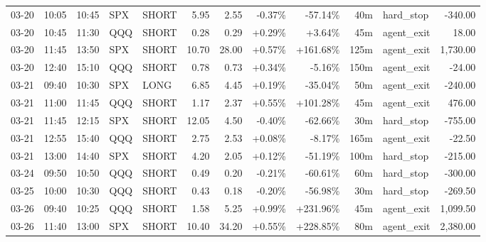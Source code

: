 \documentclass[11pt,a4paper,twoside]{article}
\begin{document}
\begin{center}
\begin{longtable}{>{\color{txtmain}}l l l l l r r r r r >{\color{txtmain}}l r}
03-20 & 10:05 & 10:45 & SPX & SHORT & 5.95 & 2.55 & \textcolor{lossred}{-0.37\%} & \textcolor{lossred}{-57.14\%} & 40m & hard\_stop & \textcolor{lossred}{-340.00} \\
03-20 & 10:45 & 11:30 & QQQ & SHORT & 0.28 & 0.29 & \textcolor{wingreen}{+0.29\%} & \textcolor{wingreen}{+3.64\%} & 45m & agent\_exit & \textcolor{wingreen}{18.00} \\
03-20 & 11:45 & 13:50 & SPX & SHORT & 10.70 & 28.00 & \textcolor{wingreen}{+0.57\%} & \textcolor{wingreen}{+161.68\%} & 125m & agent\_exit & \textcolor{wingreen}{1,730.00} \\
03-20 & 12:40 & 15:10 & QQQ & SHORT & 0.78 & 0.73 & \textcolor{wingreen}{+0.34\%} & \textcolor{lossred}{-5.16\%} & 150m & agent\_exit & \textcolor{lossred}{-24.00} \\
03-21 & 09:40 & 10:30 & SPX & LONG & 6.85 & 4.45 & \textcolor{wingreen}{+0.19\%} & \textcolor{lossred}{-35.04\%} & 50m & agent\_exit & \textcolor{lossred}{-240.00} \\
03-21 & 11:00 & 11:45 & QQQ & SHORT & 1.17 & 2.37 & \textcolor{wingreen}{+0.55\%} & \textcolor{wingreen}{+101.28\%} & 45m & agent\_exit & \textcolor{wingreen}{476.00} \\
03-21 & 11:45 & 12:15 & SPX & SHORT & 12.05 & 4.50 & \textcolor{lossred}{-0.40\%} & \textcolor{lossred}{-62.66\%} & 30m & hard\_stop & \textcolor{lossred}{-755.00} \\
03-21 & 12:55 & 15:40 & QQQ & SHORT & 2.75 & 2.53 & \textcolor{wingreen}{+0.08\%} & \textcolor{lossred}{-8.17\%} & 165m & agent\_exit & \textcolor{lossred}{-22.50} \\
03-21 & 13:00 & 14:40 & SPX & SHORT & 4.20 & 2.05 & \textcolor{wingreen}{+0.12\%} & \textcolor{lossred}{-51.19\%} & 100m & hard\_stop & \textcolor{lossred}{-215.00} \\
03-24 & 09:50 & 10:50 & QQQ & SHORT & 0.49 & 0.20 & \textcolor{lossred}{-0.21\%} & \textcolor{lossred}{-60.61\%} & 60m & hard\_stop & \textcolor{lossred}{-300.00} \\
03-25 & 10:00 & 10:30 & QQQ & SHORT & 0.43 & 0.18 & \textcolor{lossred}{-0.20\%} & \textcolor{lossred}{-56.98\%} & 30m & hard\_stop & \textcolor{lossred}{-269.50} \\
03-26 & 09:40 & 10:25 & QQQ & SHORT & 1.58 & 5.25 & \textcolor{wingreen}{+0.99\%} & \textcolor{wingreen}{+231.96\%} & 45m & agent\_exit & \textcolor{wingreen}{1,099.50} \\
03-26 & 11:40 & 13:00 & SPX & SHORT & 10.40 & 34.20 & \textcolor{wingreen}{+0.55\%} & \textcolor{wingreen}{+228.85\%} & 80m & agent\_exit & \textcolor{wingreen}{2,380.00} \\

\end{longtable}
\end{center}
\end{document}
